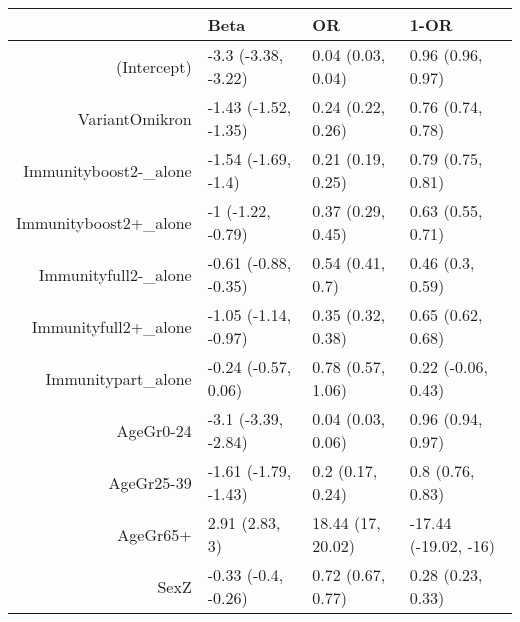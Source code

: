 \begin{table}[ht]
\centering
\begin{tabular}{rlll}
  \hline
 & Beta & OR & 1-OR \\ 
  \hline
(Intercept) & -3.3 (-3.38, -3.22) & 0.04 (0.03, 0.04) & 0.96 (0.96, 0.97) \\ 
  VariantOmikron & -1.43 (-1.52, -1.35) & 0.24 (0.22, 0.26) & 0.76 (0.74, 0.78) \\ 
  Immunityboost2-\_alone & -1.54 (-1.69, -1.4) & 0.21 (0.19, 0.25) & 0.79 (0.75, 0.81) \\ 
  Immunityboost2+\_alone & -1 (-1.22, -0.79) & 0.37 (0.29, 0.45) & 0.63 (0.55, 0.71) \\ 
  Immunityfull2-\_alone & -0.61 (-0.88, -0.35) & 0.54 (0.41, 0.7) & 0.46 (0.3, 0.59) \\ 
  Immunityfull2+\_alone & -1.05 (-1.14, -0.97) & 0.35 (0.32, 0.38) & 0.65 (0.62, 0.68) \\ 
  Immunitypart\_alone & -0.24 (-0.57, 0.06) & 0.78 (0.57, 1.06) & 0.22 (-0.06, 0.43) \\ 
  AgeGr0-24 & -3.1 (-3.39, -2.84) & 0.04 (0.03, 0.06) & 0.96 (0.94, 0.97) \\ 
  AgeGr25-39 & -1.61 (-1.79, -1.43) & 0.2 (0.17, 0.24) & 0.8 (0.76, 0.83) \\ 
  AgeGr65+ & 2.91 (2.83, 3) & 18.44 (17, 20.02) & -17.44 (-19.02, -16) \\ 
  SexZ & -0.33 (-0.4, -0.26) & 0.72 (0.67, 0.77) & 0.28 (0.23, 0.33) \\ 
   \hline
\end{tabular}
\end{table}
